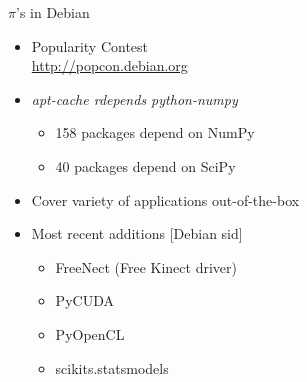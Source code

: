 \documentclass[]{beamer}
\newcommand{\veil}[0]{%
 \begin{textblock*}{115mm}[0,0](7mm, 20mm)%
    \texttt{[image: neuropy\_history\_tuned/00veil\_sw.png]}
  \end{textblock*}}
\newcommand{\veilverbatim}[1]{%
  \veil
  \begin{textblock*}{105mm}[0,0](12mm,20mm)%
    \begin{small}
    \begin{verbatim}
#1
    \end{verbatim}
    \end{small}
  \end{textblock*}
}
\begin{document}

\begin{frame}{$\pi$'s in Debian%
%
%
%
%
%
%
%
%
    }
  \begin{itemize}
  \item<1-5,12-> Popularity Contest\\
    \url{http://popcon.debian.org}\\
  \item<5,12-> \emph{apt-cache rdepends python-numpy}
    \begin{itemize}
    \item 158 packages depend on NumPy
    \item 40 packages depend on SciPy
    \end{itemize}
  \item<12-> Cover variety of applications \alert{out-of-the-box}
  \item<12-> Most recent additions [Debian sid]
    \begin{itemize}
    \item FreeNect (Free Kinect driver)
    \item PyCUDA
    \item PyOpenCL
    \item scikits.statsmodels
    \end{itemize}
  \end{itemize}


\end{frame}
\end{document}
